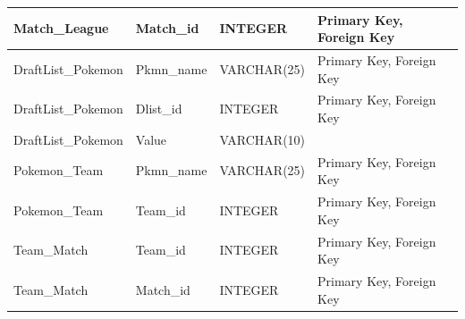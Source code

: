 \documentclass{article}
\begin{document}
\begin{table}[H]
\begin{tabular}{|l|l|l|l|}
    {\color[HTML]{2E3436} Match\_League} & {\color[HTML]{2E3436} Match\_id} & {\color[HTML]{2E3436} INTEGER} & {\color[HTML]{2E3436} Primary Key, Foreign Key} \\ \hline
    {\color[HTML]{2E3436} DraftList\_Pokemon} & {\color[HTML]{2E3436} Pkmn\_name} & {\color[HTML]{2E3436} VARCHAR(25)} & {\color[HTML]{2E3436} Primary Key, Foreign Key} \\ \hline
    {\color[HTML]{2E3436} DraftList\_Pokemon} & {\color[HTML]{2E3436} Dlist\_id} & {\color[HTML]{2E3436} INTEGER} & {\color[HTML]{2E3436} Primary Key, Foreign Key} \\ \hline
    {\color[HTML]{2E3436} DraftList\_Pokemon} & {\color[HTML]{2E3436} Value} & {\color[HTML]{2E3436} VARCHAR(10)} & {\color[HTML]{2E3436} } \\ \hline
    {\color[HTML]{2E3436} Pokemon\_Team} & {\color[HTML]{2E3436} Pkmn\_name} & {\color[HTML]{2E3436} VARCHAR(25)} & {\color[HTML]{2E3436} Primary Key, Foreign Key} \\ \hline
    {\color[HTML]{2E3436} Pokemon\_Team} & {\color[HTML]{2E3436} Team\_id} & {\color[HTML]{2E3436} INTEGER} & {\color[HTML]{2E3436} Primary Key, Foreign Key} \\ \hline
    {\color[HTML]{2E3436} Team\_Match} & {\color[HTML]{2E3436} Team\_id} & {\color[HTML]{2E3436} INTEGER} & {\color[HTML]{2E3436} Primary Key, Foreign Key} \\ \hline
    {\color[HTML]{2E3436} Team\_Match} & {\color[HTML]{2E3436} Match\_id} & {\color[HTML]{2E3436} INTEGER} & {\color[HTML]{2E3436} Primary Key, Foreign Key} \\ \hline
    \end{tabular}
\end{table}
\end{document}
